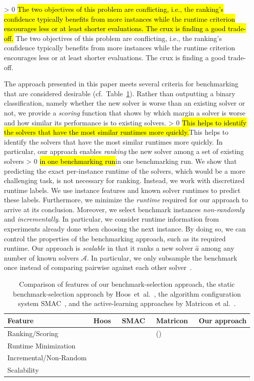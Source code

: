 \documentclass[sn-basic, Numbered]{sn-jnl} %
\newcommand{\cmark}{\ding{51}} %
\newcommand{\xmark}{\ding{55}}
\newcommand{\showchanges}{1} %
\newcommand{\change}[1]{\ifnum \showchanges > 0 \sethlcolor{yellow}\hl{#1}\else#1\fi}
\begin{document}
\change{
The two objectives of this problem are conflicting, i.e., the ranking's confidence typically benefits from more instances while the runtime criterion encourages less or at least shorter evaluations.
The crux is finding a good trade-off.
}

The approach presented in this paper meets several criteria for benchmarking that are considered desirable (cf.~Table~\ref{tab:requirements}).
Rather than outputting a binary classification, namely whether the new solver is worse than an existing solver or not, we provide a \emph{scoring} function that shows by which margin a solver is worse and how similar its performance is to existing solvers.
\change{This helps to identify the solvers that have the most similar runtimes more quickly.}
In particular, our approach enables \emph{ranking} the new solver among a set of existing solvers \change{in one benchmarking run}.
We show that predicting the exact per-instance runtime of the solvers, which would be a more challenging task, is not necessary for ranking.
Instead, we work with discretized runtime labels.
We use instance features and known solver runtimes to predict these labels.
Furthermore, we minimize the \emph{runtime} required for our approach to arrive at its conclusion.
Moreover, we select benchmark instances \emph{non-randomly} and \emph{incrementally}.
In particular, we consider runtime information from experiments already done when choosing the next instance.
By doing so, we can control the properties of the benchmarking approach, such as its required runtime.
Our approach is \emph{scalable} in that it ranks a new solver $\hat{a}$ among any number of known solvers $\mathcal{A}$.
In particular, we only subsample the benchmark once instead of comparing pairwise against each other solver~\cite{MatriconAFSH21}.

\begin{table}[tbp]
  \centering
  \caption{Comparison of features of our benchmark-selection approach, the static benchmark-selection approach by Hoos~et~al.~\cite{HoosKSS13}, the algorithm configuration system SMAC~\cite{HutterHL11}, and the active-learning approaches by Matricon et al.~\cite{MatriconAFSH21}.
  }
  \label{tab:requirements}
  \begin{tabular}{
    m{}
    >{\centering\arraybackslash}m{}
    >{\centering\arraybackslash}m{}
    >{\centering\arraybackslash}m{}
    >{\centering\arraybackslash}m{}
  }
    \toprule
    Feature & Hoos~\cite{HoosKSS13} & SMAC~\cite{HutterHL11} & Matricon~\cite{MatriconAFSH21} & Our approach \\
    \midrule
    Ranking/Scoring & \cmark & \xmark & (\cmark) & \cmark \\
    Runtime Minimization & \xmark & \cmark & \cmark & \cmark \\
    Incremental/Non-Random & \xmark & \xmark & \cmark & \cmark \\
    Scalability & \cmark & \cmark & \xmark & \cmark \\
    \bottomrule
  \end{tabular}
\end{table}
\end{document}
